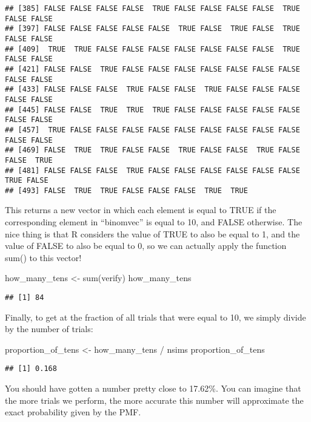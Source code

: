 \documentclass[
]{book}
\newenvironment{Shaded}{\begin{snugshade}}{\end{snugshade}}
\newcommand{\FunctionTok}[1]{\textcolor[rgb]{0.00,0.00,0.00}{#1}}
\newcommand{\NormalTok}[1]{#1}
\newcommand{\OtherTok}[1]{\textcolor[rgb]{0.56,0.35,0.01}{#1}}
\newcommand{\SpecialCharTok}[1]{\textcolor[rgb]{0.00,0.00,0.00}{#1}}
\begin{document}
\begin{verbatim}
## [385] FALSE FALSE FALSE FALSE  TRUE FALSE FALSE FALSE FALSE  TRUE FALSE FALSE
## [397] FALSE FALSE FALSE FALSE FALSE  TRUE FALSE  TRUE FALSE  TRUE FALSE FALSE
## [409]  TRUE  TRUE FALSE FALSE FALSE FALSE FALSE FALSE FALSE  TRUE FALSE FALSE
## [421] FALSE FALSE  TRUE FALSE FALSE FALSE FALSE FALSE FALSE FALSE FALSE FALSE
## [433] FALSE FALSE FALSE  TRUE FALSE FALSE  TRUE FALSE FALSE FALSE FALSE FALSE
## [445] FALSE FALSE  TRUE  TRUE  TRUE FALSE FALSE FALSE FALSE FALSE FALSE FALSE
## [457]  TRUE FALSE FALSE FALSE FALSE FALSE FALSE FALSE FALSE FALSE FALSE FALSE
## [469] FALSE  TRUE  TRUE FALSE FALSE  TRUE FALSE FALSE  TRUE FALSE FALSE  TRUE
## [481] FALSE FALSE FALSE  TRUE FALSE FALSE FALSE FALSE FALSE FALSE  TRUE FALSE
## [493] FALSE  TRUE  TRUE FALSE FALSE FALSE  TRUE  TRUE
\end{verbatim}

This returns a new vector in which each element is equal to TRUE if the corresponding element in ``binomvec'' is equal to 10, and FALSE otherwise. The nice thing is that R considers the value of TRUE to also be equal to 1, and the value of FALSE to also be equal to 0, so we can actually apply the function sum() to this vector!

\begin{Shaded}
\begin{Highlighting}[]
\NormalTok{how\_many\_tens }\OtherTok{\textless{}{-}} \FunctionTok{sum}\NormalTok{(verify)}
\NormalTok{how\_many\_tens}
\end{Highlighting}
\end{Shaded}

\begin{verbatim}
## [1] 84
\end{verbatim}

Finally, to get at the fraction of all trials that were equal to 10, we simply divide by the number of trials:

\begin{Shaded}
\begin{Highlighting}[]
\NormalTok{proportion\_of\_tens }\OtherTok{\textless{}{-}}\NormalTok{ how\_many\_tens }\SpecialCharTok{/}\NormalTok{ nsims}
\NormalTok{proportion\_of\_tens}
\end{Highlighting}
\end{Shaded}

\begin{verbatim}
## [1] 0.168
\end{verbatim}

You should have gotten a number pretty close to 17.62\%. You can imagine that the more trials we perform, the more accurate this number will approximate the exact probability given by the PMF.
\end{document}
